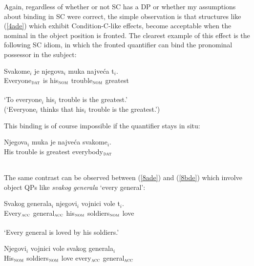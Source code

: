 \documentclass[
    output=paper,
    colorlinks,
    citecolor=brown,
]{langscibook}
\begin{document}
Again, regardless of whether or not SC has a DP or whether my assumptions about binding in SC were correct, the simple observation is that structures like (\ref{4ade}) which exhibit Condition-C-like effects, become acceptable when the nominal in the object position is fronted. The clearest example of this effect is the following SC idiom, in which the fronted quantifier can bind the pronominal possessor in the subject:

\begin{exe}
\ex \label{6de}
\gll Svakome$_{i}$  je njegova$_{i}$ muka najveća  t$_{i}$.\\
Everyone$_{\textsc{dat}}$ is his$_{\textsc{nom}}$ trouble$_{\textsc{nom}}$ greatest\\\\
‘To everyone$_{i}$ his$_{i}$ trouble is the greatest.’ \\
(‘Everyone$_{i}$ thinks that his$_{i}$ trouble is the greatest.’)
\end{exe}

This binding is of course impossible if the quantifier stays in situ:

\begin{exe}
\ex \label{7de}
\gll *Njegova$_{i}$ muka   je  najveća  svakome$_{i}$.\\
His trouble is greatest everybody$_{\textsc{dat}}$\\\\
\end{exe}

The same contrast can be observed between (\ref{8ade}) and (\ref{8bde}) which involve object QPs like \textit{svakog generala} ‘every general’:

\begin{exe}
\ex \label{8de}
\begin{xlist}
\ex \label{8ade}
\gll Svakog generala$_{i}$ njegovi$_{i}$ vojnici vole t$_{i}$.\\
Every$_{\textsc{acc}}$ general$_{\textsc{acc}}$ his$_{\textsc{nom}}$ soldiers$_{\textsc{nom}}$ love\\\\
‘Every general is loved by his soldiers.’

\ex \label{8bde}
\gll *Njegovi$_{i}$ vojnici vole svakog generala$_{i}$\\
His$_{\textsc{nom}}$ soldiers$_{\textsc{nom}}$ love every$_{\textsc{acc}}$ general$_{\textsc{acc}}$\\\\

\end{xlist}
\end{exe}
\end{document}
